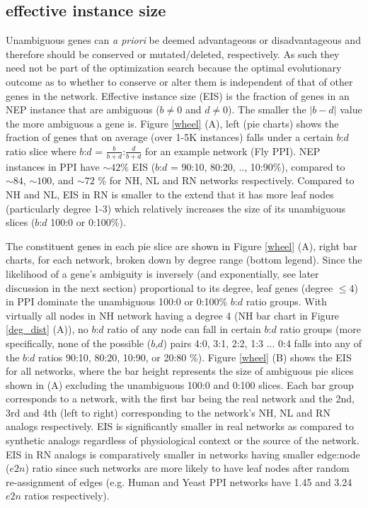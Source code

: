 \documentclass[12pt]{article}
\begin{document}
\subsection{effective instance size}\label{sec:EIS}
Unambiguous genes can \textit{a priori} be deemed  advantageous or disadvantageous and therefore should be conserved or mutated/deleted, respectively.  As such they need not be part of the optimization search because the optimal evolutionary outcome as to whether to conserve or alter them is independent of that of other genes in the network. Effective instance size (EIS) is the fraction of genes in an NEP instance that are ambiguous ($b\neq 0$ and $d\neq 0$). The smaller the $|b-d|$ value the more ambiguous a gene is. Figure \ref{wheel} (A), left (pie charts) shows the  fraction of genes that on average (over 1-5K instances) falls under a certain $b$:$d$ ratio slice where $b$:$d$ =  $\frac{b}{b+d}$:$\frac{d}{b+d}$ for an example network (Fly PPI). NEP instances in PPI have ${\sim}42\%$ EIS ($b$:$d$ = 90:10, 80:20, .., 10:90\%), compared to ${\sim}84$, ${\sim}100$, and ${\sim}72$ \% for NH, NL and RN networks respectively. Compared to NH and NL, EIS in RN is smaller to the extend that it has more leaf nodes (particularly degree 1-3) which relatively increases the size of its unambiguous slices ($b$:$d$ 100:0 or 0:100\%).

The constituent genes in each pie slice are shown in Figure \ref{wheel} (A), right bar charts, for each network, broken down by degree range (bottom legend). Since the likelihood of a gene's ambiguity is inversely (and exponentially, see later discussion in the next section) proportional to its degree, leaf genes (degree $\leq 4$) in PPI dominate the unambiguous 100:0 or 0:100\% $b$:$d$ ratio groups. With virtually all nodes  in NH network having a degree 4 (NH bar chart in Figure \ref{deg_dist} (A)), no $b$:$d$ ratio of any node can fall in certain $b$:$d$ ratio groups (more specifically, none of the possible ($b$,$d$) pairs 4:0, 3:1, 2:2, 1:3 ... 0:4 falls into any of the $b$:$d$ ratios 90:10, 80:20, 10:90, or  20:80 \%). Figure \ref{wheel} (B) shows the EIS for all networks, where the bar height represents the size of ambiguous pie slices shown in (A) excluding the unambiguous 100:0 and 0:100 slices. Each bar group corresponds to a network, with the first bar being the real network and the 2nd, 3rd and 4th (left to right) corresponding to the network's NH, NL and RN analogs respectively. EIS is significantly smaller in real networks as compared to synthetic analogs regardless of physiological context or the source of the network. EIS in RN analogs is comparatively smaller in networks having smaller edge:node ($e2n$) ratio since such networks are more likely to have leaf nodes after random re-assignment of edges (e.g. Human and Yeast PPI networks have 1.45 and 3.24 $e2n$ ratios respectively).
\end{document}
